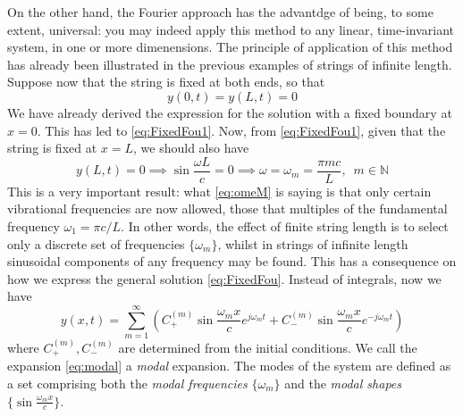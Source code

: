 \documentclass[11pt,twoside,a4paper,english]{book}
\begin{document}
On the other hand, the Fourier approach has the advantdge of being, to some extent, universal: you may indeed apply this method to any linear, time-invariant system, in one or more dimenensions. The principle of application of this method has already been illustrated in the previous examples of strings of infinite length. Suppose now that the string is fixed at both ends, so that
\begin{equation}
y(0,t) = y(L,t) = 0
\end{equation}
We have already derived the expression for the solution with a fixed boundary at $x=0$. This has led to \eqref{eq:FixedFou1}. Now, from \eqref{eq:FixedFou1}, given that the string is fixed at $x=L$, we should also have
\begin{equation}\label{eq:omeM}
y(L,t) = 0 \implies \sin \frac{\omega L}{c} = 0 \implies \omega = \omega_m = \frac{\pi m c}{L}, \,\,\, m \in \mathbb{N}
\end{equation}
This is a very important result: what \eqref{eq:omeM} is saying is that only certain vibrational frequencies are now allowed, those that multiples of the fundamental frequency $\omega_1 = \pi c / L$. In other words, the effect of finite string length is to select only a discrete set of frequencies $\{ \omega_m \}$, whilst in strings of infinite length sinusoidal components of any frequency may be found. This has a consequence on how we express the general solution \eqref{eq:FixedFou}. Instead of integrals, now we have
\begin{equation}\label{eq:modal}
y(x,t) = \sum_{m=1}^{\infty } \left( C_+^{(m)} \sin \frac{\omega_m x}{c} e^{j \omega_m t} +  C_-^{(m)} \sin \frac{\omega_m x}{c} e^{-j \omega_m t} \right)
\end{equation}
where $C_+^{(m)},C_-^{(m)}$ are determined from the initial conditions. We call the expansion \eqref{eq:modal} a \emph{modal} expansion. The modes of the system are defined as a set comprising both the \emph{modal frequencies} $\{ \omega_m \}$ and the \emph{modal shapes} $\{\sin \frac{\omega_m x}{c}\}$.

\medskip \medskip 
\end{document}

